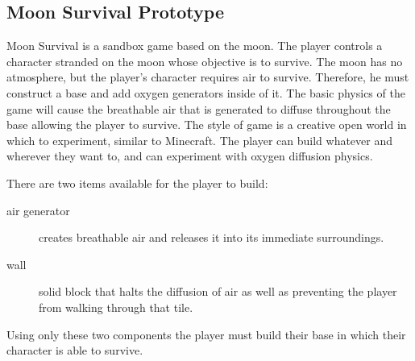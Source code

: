 \subsection{Moon Survival Prototype}
\label{sec:rd:moonSurvival}

Moon Survival is a sandbox game based on the moon. The player controls a character stranded on the moon whose objective is to survive. The moon has no atmosphere, but the player's character requires air to survive. Therefore, he must construct a base and add oxygen generators inside of it. The basic physics of the game will cause the breathable air that is generated to diffuse throughout the base allowing the player to survive. The style of game is a creative open world in which to experiment, similar to Minecraft. The player can build whatever and wherever they want to, and can experiment with oxygen diffusion physics.

There are two items available for the player to build: 

\begin{description}
\item[air generator] creates breathable air and releases it into its immediate surroundings. 
\item[wall] solid block that halts the diffusion of air as well as preventing the player from walking through that tile.
\end{description}
\noindent
Using only these two components the player must build their base in which their character is able to survive.

